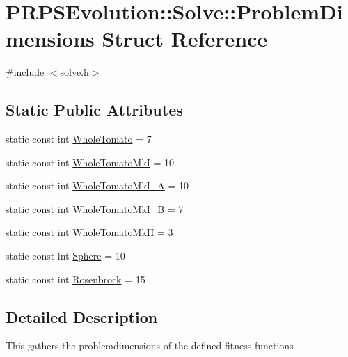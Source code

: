 \hypertarget{struct_p_r_p_s_evolution_1_1_solve_1_1_problem_dimensions}{\section{\-P\-R\-P\-S\-Evolution\-:\-:\-Solve\-:\-:\-Problem\-Dimensions \-Struct \-Reference}
\label{struct_p_r_p_s_evolution_1_1_solve_1_1_problem_dimensions}
}


{\ttfamily \#include $<$solve.\-h$>$}

\subsection*{\-Static \-Public \-Attributes}
\begin{DoxyCompactItemize}
\item 
static const int \hyperlink{struct_p_r_p_s_evolution_1_1_solve_1_1_problem_dimensions_a9e54d1df0a67914dba7239262702014f}{\-Whole\-Tomato} = 7
\item 
static const int \hyperlink{struct_p_r_p_s_evolution_1_1_solve_1_1_problem_dimensions_a9d8e25f724aed569c75531d9a74b2ffb}{\-Whole\-Tomato\-Mk\-I} = 10
\item 
static const int \hyperlink{struct_p_r_p_s_evolution_1_1_solve_1_1_problem_dimensions_aee6e2c8a8f5c45df25b93bcabb0fb620}{\-Whole\-Tomato\-Mk\-I\-\_\-\-A} = 10
\item 
static const int \hyperlink{struct_p_r_p_s_evolution_1_1_solve_1_1_problem_dimensions_a5a1ca81dc91ae69520ef0c2011028d8c}{\-Whole\-Tomato\-Mk\-I\-\_\-\-B} = 7
\item 
static const int \hyperlink{struct_p_r_p_s_evolution_1_1_solve_1_1_problem_dimensions_afe2da474e32975df166dfc35688e5f62}{\-Whole\-Tomato\-Mk\-I\-I} = 3
\item 
static const int \hyperlink{struct_p_r_p_s_evolution_1_1_solve_1_1_problem_dimensions_ad9618a30818a9c1933fb44f0faa8fa06}{\-Sphere} = 10
\item 
static const int \hyperlink{struct_p_r_p_s_evolution_1_1_solve_1_1_problem_dimensions_ad0ee4c5c3488a890cbf8e4989ec2b922}{\-Rosenbrock} = 15
\end{DoxyCompactItemize}


\subsection{\-Detailed \-Description}
\-This gathers the problemdimensions of the defined fitness functions 

